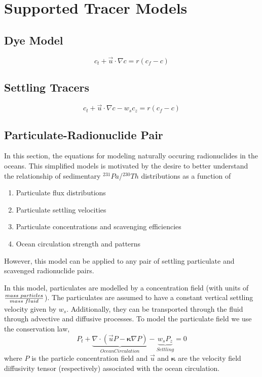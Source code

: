\documentclass{softwaremanual}
\begin{document}
\chapter{Supported Tracer Models}

\section{Dye Model}

\begin{equation}
 c_t + \vec{u} \cdot \nabla c = r( c_f - c )
\end{equation}

\section{Settling Tracers}

\begin{equation}
 c_t + \vec{u} \cdot \nabla c -w_s c_z = r( c_f - c )
\end{equation}

\section{Particulate-Radionuclide Pair}
In this section, the equations for modeling naturally occuring radionuclides in the oceans. This simplified models is motivated by the desire to better understand the relationship of sedimentary $^{231}Pa$/$^{230}Th$ distributions as a function of 
\begin{enumerate}
\item Particulate flux distributions
\item Particulate settling velocities
\item Particulate concentrations and scavenging efficiencies
\item Ocean circulation strength and patterns
\end{enumerate}
However, this model can be applied to any pair of settling particulate and scavenged radionuclide pairs.

In this model, particulates are modelled by a concentration field (with units of $\frac{mass \hspace{1mm} particles}{mass \hspace{1mm} fluid}$). The particulates are assumed to have a constant vertical settling velocity given by $w_s$. Additionally, they can be transported through the fluid through advective and diffusive processes. To model the particulate field we use the conservation law,
\begin{equation}
P_t + \underbrace{\nabla \cdot ( \vec{u} P - \boldsymbol{\kappa} \nabla P ) }_{Ocean Circulation} - \underbrace{w_s P_z}_{Settling} = 0
\end{equation}
where $P$ is the particle concentration field and $\vec{u}$ and $\boldsymbol{\kappa}$ are the velocity field diffusivity tensor (respectively) associated with the ocean circulation.
\end{document}
